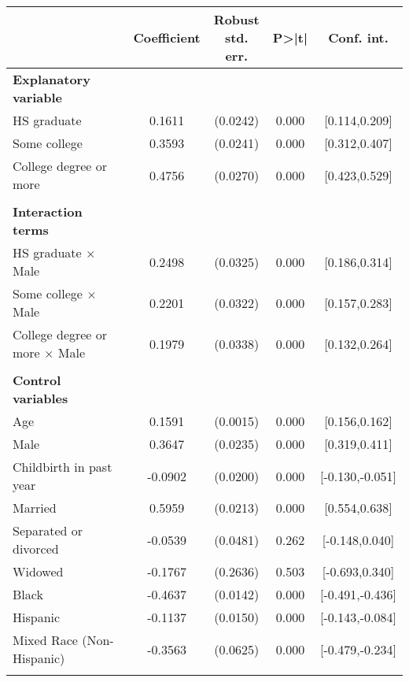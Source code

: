 {
\def\sym#1{\ifmmode^{#1}\else\(^{#1}\)\fi}
\begin{tabular}{l*{1}{cccc}}
\toprule
                    & Coefficient&\shortstack{Robust\\std. err.}&       P>|t|&  Conf. int.\\
\midrule
\textbf{Explanatory variable}&            &            &            &            \\
HS graduate         &      0.1611&    (0.0242)&       0.000&[0.114,0.209]\\
Some college        &      0.3593&    (0.0241)&       0.000&[0.312,0.407]\\
College degree or more&      0.4756&    (0.0270)&       0.000&[0.423,0.529]\\
\\ \textbf{Interaction terms}&            &            &            &            \\
HS graduate $\times$ Male&      0.2498&    (0.0325)&       0.000&[0.186,0.314]\\
Some college $\times$ Male&      0.2201&    (0.0322)&       0.000&[0.157,0.283]\\
College degree or more $\times$ Male&      0.1979&    (0.0338)&       0.000&[0.132,0.264]\\
\\ \textbf{Control variables}&            &            &            &            \\
Age                 &      0.1591&    (0.0015)&       0.000&[0.156,0.162]\\
Male                &      0.3647&    (0.0235)&       0.000&[0.319,0.411]\\
Childbirth in past year&     -0.0902&    (0.0200)&       0.000&[-0.130,-0.051]\\
Married             &      0.5959&    (0.0213)&       0.000&[0.554,0.638]\\
Separated or divorced&     -0.0539&    (0.0481)&       0.262&[-0.148,0.040]\\
Widowed             &     -0.1767&    (0.2636)&       0.503&[-0.693,0.340]\\
Black               &     -0.4637&    (0.0142)&       0.000&[-0.491,-0.436]\\
Hispanic            &     -0.1137&    (0.0150)&       0.000&[-0.143,-0.084]\\
Mixed Race (Non-Hispanic)&     -0.3563&    (0.0625)&       0.000&[-0.479,-0.234]\\
                    &            &            &            &            \\

\end{tabular}}
